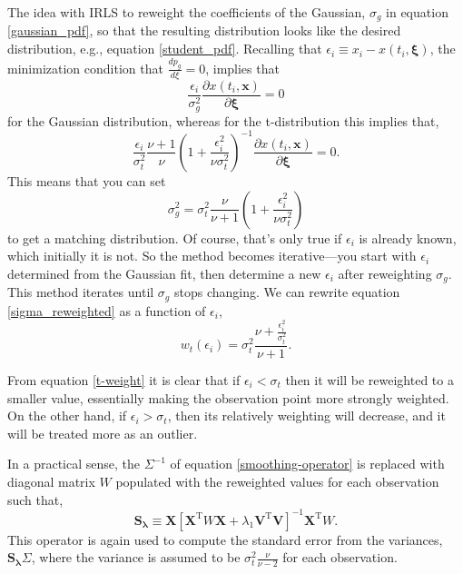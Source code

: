 \documentclass[10pt,journal]{IEEEtran}
\begin{document}
The idea with IRLS to reweight the coefficients of the Gaussian, $\sigma_g$ in equation \ref{gaussian_pdf}, so that the resulting distribution looks like the desired distribution, e.g., equation \ref{student_pdf}. Recalling that $\epsilon_i \equiv x_i - x(t_i,\mathbf{\xi})$, the minimization condition that $\frac{d p_g}{d\xi}=0$, implies that
\begin{equation}
\frac{\epsilon_i}{\sigma_g^2} \frac{\partial x(t_i,\mathbf{x})}{\partial \mathbf{\xi}} = 0
\end{equation}
for the Gaussian distribution, whereas for the t-distribution this implies that,
\begin{equation}
 \frac{\epsilon_i}{\sigma_t^2} \frac{\nu+1}{\nu} \left( 1 + \frac{\epsilon_i^2}{\nu \sigma_t^2} \right)^{-1}  \frac{\partial x(t_i,\mathbf{x})}{\partial \mathbf{\xi}}  = 0.
\end{equation}
This means that you can set
\begin{equation}
\sigma_g^2 =   \sigma_t^2 \frac{\nu}{\nu+1} \left( 1 + \frac{\epsilon_i^2}{\nu \sigma_t^2} \right)
\label{sigma_reweighted}
\end{equation}
to get a matching distribution. Of course, that's only true if $\epsilon_i$ is already known, which initially it is not. So the method becomes iterative---you start with $\epsilon_i$ determined from the Gaussian fit, then determine a new $\epsilon_i$ after reweighting $\sigma_g$. This method iterates until $\sigma_g$ stops changing. We can rewrite equation \ref{sigma_reweighted} as a function of $\epsilon_i$,
\begin{equation}
\label{t-weight}
w_t(\epsilon_i) = \sigma_t^2 \frac{\nu  + \frac{\epsilon_i^2}{\sigma_t^2}}{\nu+1}.
\end{equation}

From equation \ref{t-weight} it is clear that if $\epsilon_i < \sigma_t$ then it will be reweighted to a smaller value, essentially making the observation point more strongly weighted. On the other hand, if $\epsilon_i > \sigma_t$, then its relatively weighting will decrease, and it will be treated more as an outlier.

In a practical sense, the $\Sigma^{-1}$ of equation \ref{smoothing-operator} is replaced with diagonal matrix $W$ populated with the reweighted values for each observation such that,
\begin{equation}
\label{general-smoothing-operator}
\mathbf{S_\lambda} \equiv \mathbf{X} \left[ \mathbf{X}^{\textrm{T}} W \mathbf{X} + \lambda_1 \mathbf{V}^{\textrm{T}} \mathbf{V} \right]^{-1} \mathbf{X}^{\textrm{T}} W.
\end{equation}
This operator is again used to compute the standard error from the variances,  $\mathbf{S_\lambda} \Sigma$, where the variance is assumed to be $\sigma_t^2 \frac{\nu}{\nu-2}$ for each observation.
\end{document}
